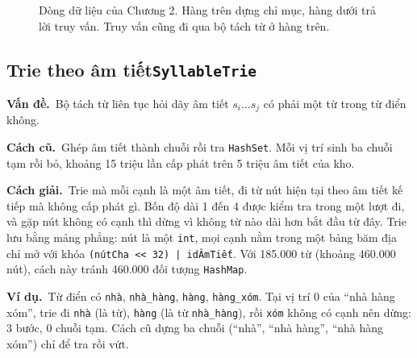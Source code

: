 \documentclass[9pt,twocolumn,a4paper]{extarticle}
\newcommand{\code}[1]{\texttt{#1}}
\newcommand{\dsa}[2]{\subsection[#1]{#1\hfill{\normalfont\footnotesize\code{#2}}}}
\newcommand{\vande}{\textcolor{linkblue}{\textbf{Vấn đề.}}~}
\newcommand{\cachgiai}{\textcolor{linkblue}{\textbf{Cách giải.}}~}
\newcommand{\cu}{\textcolor{linkblue}{\textbf{Cách cũ.}}~}
\newcommand{\vidu}{\textcolor{linkblue}{\textbf{Ví dụ.}}~}
\begin{document}
\begin{figure}[H]
\centering
{}
\caption{Dòng dữ liệu của Chương 2. Hàng trên dựng chỉ mục, hàng dưới trả lời truy vấn. Truy vấn cũng đi qua bộ tách từ ở hàng trên.}
\label{fig:pipe2}
\end{figure}

\dsa{Trie theo âm tiết}{SyllableTrie}
\vande Bộ tách từ liên tục hỏi dãy âm tiết $s_i\dots s_j$ có phải một từ trong từ điển không.

\cu Ghép âm tiết thành chuỗi rồi tra \code{HashSet}. Mỗi vị trí sinh ba chuỗi tạm rồi bỏ, khoảng 15 triệu lần cấp phát trên 5 triệu âm tiết của kho.

\cachgiai Trie mà mỗi cạnh là một âm tiết, đi từ nút hiện tại theo âm tiết kế tiếp mà không cấp phát gì. Bốn độ dài 1 đến 4 được kiểm tra trong một lượt đi, và gặp nút không có cạnh thì dừng vì không từ nào dài hơn bắt đầu từ đây. Trie lưu bằng mảng phẳng: nút là một \code{int}, mọi cạnh nằm trong một bảng băm địa chỉ mở với khóa \code{(nútCha << 32) | idÂmTiết}. Với 185.000 từ (khoảng 460.000 nút), cách này tránh 460.000 đối tượng \code{HashMap}.

\vidu Từ điển có \code{nhà}, \code{nhà\_hàng}, \code{hàng}, \code{hàng\_xóm}. Tại vị trí 0 của ``nhà hàng xóm'', trie đi \code{nhà} (là từ), \code{hàng} (là từ \code{nhà\_hàng}), rồi \code{xóm} không có cạnh nên dừng: 3 bước, 0 chuỗi tạm. Cách cũ dựng ba chuỗi (``nhà'', ``nhà hàng'', ``nhà hàng xóm'') chỉ để tra rồi vứt.
\end{document}
